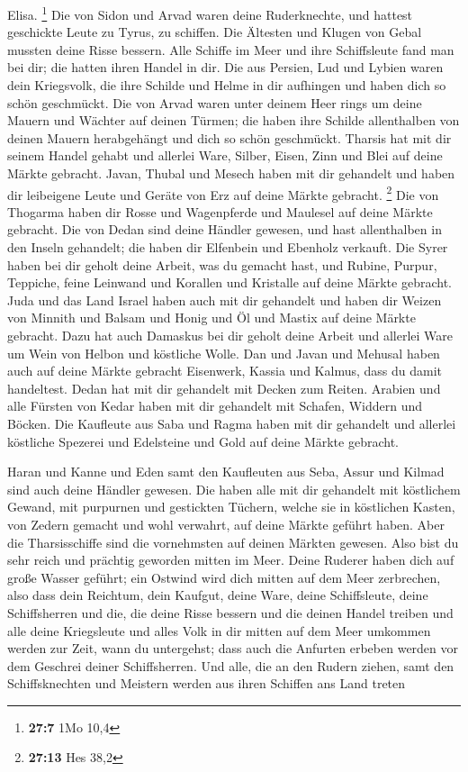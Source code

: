 Elisa. \footnote{\textbf{27:7} 1Mo 10,4}  Die von Sidon und
Arvad waren deine Ruderknechte, und hattest geschickte Leute zu Tyrus,
zu schiffen.  Die Ältesten und Klugen von Gebal mussten
deine Risse bessern. Alle Schiffe im Meer und ihre Schiffsleute fand man
bei dir; die hatten ihren Handel in dir.  Die aus Persien,
Lud und Lybien waren dein Kriegsvolk, die ihre Schilde und Helme in dir
aufhingen und haben dich so schön geschmückt.  Die von
Arvad waren unter deinem Heer rings um deine Mauern und Wächter auf
deinen Türmen; die haben ihre Schilde allenthalben von deinen Mauern
herabgehängt und dich so schön geschmückt.  Tharsis hat mit
dir seinem Handel gehabt und allerlei Ware, Silber, Eisen, Zinn und Blei
auf deine Märkte gebracht.  Javan, Thubal und Mesech haben
mit dir gehandelt und haben dir leibeigene Leute und Geräte von Erz auf
deine Märkte gebracht. \footnote{\textbf{27:13} Hes 38,2} 
Die von Thogarma haben dir Rosse und Wagenpferde und Maulesel auf deine
Märkte gebracht.  Die von Dedan sind deine Händler gewesen,
und hast allenthalben in den Inseln gehandelt; die haben dir Elfenbein
und Ebenholz verkauft.  Die Syrer haben bei dir geholt
deine Arbeit, was du gemacht hast, und Rubine, Purpur, Teppiche, feine
Leinwand und Korallen und Kristalle auf deine Märkte gebracht.
 Juda und das Land Israel haben auch mit dir gehandelt und
haben dir Weizen von Minnith und Balsam und Honig und Öl und Mastix auf
deine Märkte gebracht.  Dazu hat auch Damaskus bei dir
geholt deine Arbeit und allerlei Ware um Wein von Helbon und köstliche
Wolle.  Dan und Javan und Mehusal haben auch auf deine
Märkte gebracht Eisenwerk, Kassia und Kalmus, dass du damit handeltest.
 Dedan hat mit dir gehandelt mit Decken zum Reiten.
 Arabien und alle Fürsten von Kedar haben mit dir gehandelt
mit Schafen, Widdern und Böcken.  Die Kaufleute aus Saba
und Ragma haben mit dir gehandelt und allerlei köstliche Spezerei und
Edelsteine und Gold auf deine Märkte gebracht.

 Haran und Kanne und Eden samt den Kaufleuten aus Seba,
Assur und Kilmad sind auch deine Händler gewesen.  Die
haben alle mit dir gehandelt mit köstlichem Gewand, mit purpurnen und
gestickten Tüchern, welche sie in köstlichen Kasten, von Zedern gemacht
und wohl verwahrt, auf deine Märkte geführt haben.  Aber
die Tharsisschiffe sind die vornehmsten auf deinen Märkten gewesen. Also
bist du sehr reich und prächtig geworden mitten im Meer. 
Deine Ruderer haben dich auf große Wasser geführt; ein Ostwind wird dich
mitten auf dem Meer zerbrechen,  also dass dein Reichtum,
dein Kaufgut, deine Ware, deine Schiffsleute, deine Schiffsherren und
die, die deine Risse bessern und die deinen Handel treiben und alle
deine Kriegsleute und alles Volk in dir mitten auf dem Meer umkommen
werden zur Zeit, wann du untergehst;  dass auch die
Anfurten erbeben werden vor dem Geschrei deiner Schiffsherren.
 Und alle, die an den Rudern ziehen, samt den
Schiffsknechten und Meistern werden aus ihren Schiffen ans Land treten

